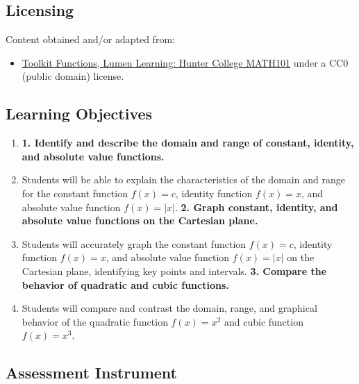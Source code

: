 \subsection{Licensing}
\label{sss:lice-7352}

Content obtained and/or adapted from:

\begin{itemize}
    \item \href{https://courses.lumenlearning.com/cuny-hunter-collegealgebra/chapter/toolkit-functions/}{Toolkit Functions, Lumen Learning: Hunter College MATH101} under a CC0 (public domain) license.
\end{itemize}

\subsection{Learning Objectives}
\label{ssec:lear-68e5}

\begin{enumerate}
    \item \textbf{1. Identify and describe the domain and range of constant, identity, and absolute value functions.}
    \item Students will be able to explain the characteristics of the domain and range for the constant function $f(x) = c$, identity function $f(x) = x$, and absolute value function $f(x) = |x|$. \textbf{2. Graph constant, identity, and absolute value functions on the Cartesian plane.}
    \item Students will accurately graph the constant function $f(x) = c$, identity function $f(x) = x$, and absolute value function $f(x) = |x|$ on the Cartesian plane, identifying key points and intervals. \textbf{3. Compare the behavior of quadratic and cubic functions.}
    \item Students will compare and contrast the domain, range, and graphical behavior of the quadratic function $f(x) = x^2$ and cubic function $f(x) = x^3$.
\end{enumerate}

\subsection{Assessment Instrument}
\label{ssec:asse-3d47}

